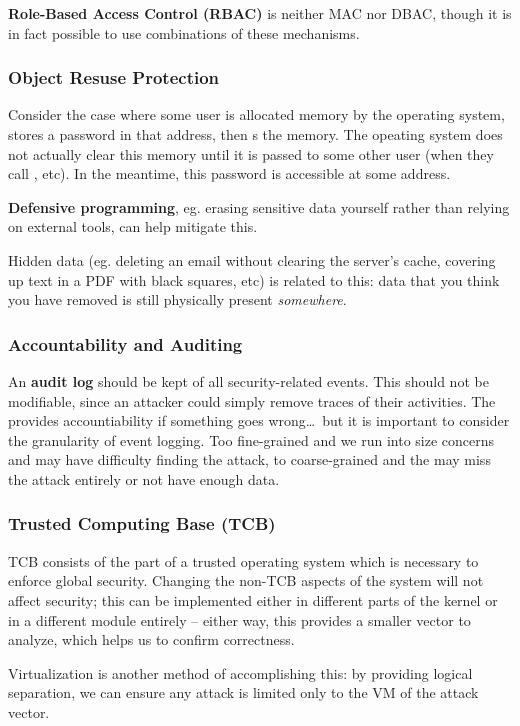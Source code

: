 \documentclass[12pt]{article}
\begin{document}
{\bf Role-Based Access Control (RBAC)} is neither MAC nor DBAC, though it is in fact possible to use combinations of these mechanisms.

\subsubsection{Object Resuse Protection}
Consider the case where some user is allocated memory by the operating system, stores a password in that address, then s the memory. The opeating system does not actually clear this memory until it is passed to some other user (when they call , etc). In the meantime, this password is accessible at some address.

{\bf Defensive programming}, eg. erasing sensitive data yourself rather than relying on external tools, can help mitigate this.

Hidden data (eg. deleting an email without clearing the server's cache, covering up text in a PDF with black squares, etc) is related to this: data that you think you have removed is still physically present \emph{somewhere}.

\subsubsection{Accountability and Auditing}
An {\bf audit log} should be kept of all security-related events. This should not be modifiable, since an attacker could simply remove traces of their activities. The provides accountiability if something goes wrong\dots\ but it is important to consider the granularity of event logging. Too fine-grained and we run into size concerns and may have difficulty finding the attack, to coarse-grained and the may miss the attack entirely or not have enough data.

\subsubsection{Trusted Computing Base (TCB)}
TCB consists of the part of a trusted operating system which is necessary to enforce global security. Changing the non-TCB aspects of the system will not affect security; this can be implemented either in different parts of the kernel or in a different module entirely -- either way, this provides a smaller vector to analyze, which helps us to confirm correctness.

Virtualization is another method of accomplishing this: by providing logical separation, we can ensure any attack is limited only to the VM of the attack vector.
\end{document}

